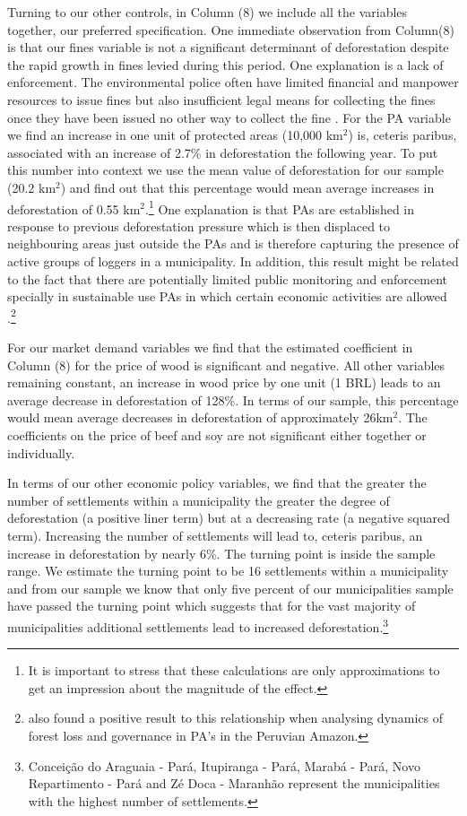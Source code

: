 Turning to our other controls, in Column (8) we include all the variables together, our preferred specification.  One immediate observation from Column(8) is that our fines variable is not a significant determinant of deforestation despite the rapid growth in fines levied during this period. One explanation is a lack of enforcement. The environmental police often have limited financial and manpower resources to issue fines but also insufficient legal means for collecting the fines once they have been issued no other way to collect the fine \citep{araujo_barreto_baima_gomes_2017}.  For the PA variable we find an increase in one unit of protected areas (10,000 km$^{2}$) is, ceteris paribus, associated with an increase of 2.7\% in deforestation the following year. To put this number into context we use the mean value of deforestation for our sample (20.2 km$^{2}$) and find out that this percentage would mean average increases in deforestation of 0.55 km$^{2}$.\footnote{It is important to stress that these calculations are only approximations to get an impression about the magnitude of the effect.} One explanation is that PAs are established in response to previous deforestation pressure which is then displaced to neighbouring areas just outside the PAs and is therefore capturing the presence of active groups of loggers in a municipality. In addition, this result might be related to the fact that there are potentially limited public monitoring and enforcement specially in sustainable use PAs in which certain economic activities are allowed \citep{RICO_2017}.\footnote{\citet{RICO_2017} also found a positive result to this relationship when analysing dynamics of forest loss and governance in PA's in the Peruvian Amazon.}

For our market demand variables we find that the estimated coefficient in Column (8) for the price of wood is significant and negative. All other variables remaining constant, an increase in wood price by one unit (1 BRL) leads to an average decrease in deforestation of 128\%. In terms of our sample, this percentage would mean average decreases in deforestation of approximately 26km$^{2}$. The coefficients on the price of beef and soy are not significant either together or individually.

In terms of our other economic policy variables, we find that the greater the number of settlements within a municipality the greater the degree of deforestation (a positive liner term) but at a decreasing rate (a negative squared term). Increasing the number of settlements will lead to, ceteris paribus, an increase in deforestation by nearly 6\%. The turning point is inside the sample range. We estimate the turning point to be 16 settlements within a municipality and from our sample we know that only five percent of our municipalities sample have passed the turning point which suggests that for the vast majority of municipalities additional settlements lead to increased deforestation.\footnote{Concei\c{c}\~{a}o do Araguaia - Par\'{a}, Itupiranga - Par\'{a}, Marab\'{a} - Par\'{a}, Novo Repartimento - Par\'{a} and Z\'{e} Doca - Maranh\~{a}o represent the municipalities with the highest number of settlements.} 


